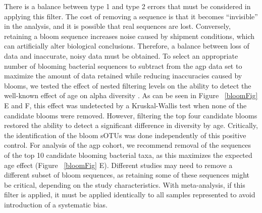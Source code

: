There is a balance between type 1 and type 2 errors that must be considered in applying this filter.
The cost of removing a sequence is that it becomes “invisible” in the analysis, and it is possible
that real sequences are lost. Conversely, retaining a bloom sequence increases noise caused by shipment
conditions, which can artificially alter biological conclusions. Therefore, a balance between loss of data
and inaccurate, noisy data must be obtained. To select an appropriate number of blooming bacterial
sequences to subtract from the \gls{agp} data set to maximize the amount of data retained while
reducing inaccuracies caused by blooms, we tested the effect of nested filtering levels on the ability
to detect the well-known effect of age on alpha diversity \cite{Yatsunenko2012, Koenig2011}.
As can be seen in Figure ~\ref{bloomFig} E and F,
this effect was undetected by a Kruskal-Wallis test when none of the candidate blooms were removed.
However, filtering the top four candidate blooms restored the ability to detect a significant
difference in diversity by age. Critically, the identification of the bloom sOTUs was done
independently of this positive control. For analysis of the \gls{agp} cohort, we recommend
removal of the sequences of the top 10 candidate blooming bacterial taxa, as this maximizes the expected
age effect (Figure ~\ref{bloomFig} E). Different studies may need to remove a different subset of
bloom sequences, as retaining some of these sequences might be critical, depending on the study
characteristics. With meta-analysis, if this filter is applied, it must be applied identically to
all samples represented to avoid introduction of a systematic bias.

